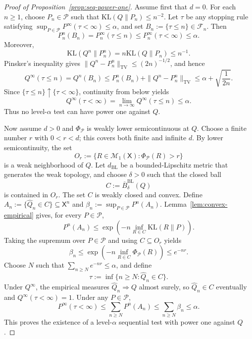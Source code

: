 \documentclass[11pt]{article}
\newcommand{\KL}{\mathrm{KL}}
\newcommand{\Pcal}{\mathcal{P}}
\newcommand{\X}{\mathsf{X}}
\theoremstyle{definition}
\theoremstyle{definition}
\begin{document}
\begin{proof}[Proof of Proposition~\ref{prop:seq-power-one}]
Assume first that $d=0$.  For each $n\ge1$, choose $P_n\in\Pcal$ such that $\KL(Q\|P_n)\le n^{-2}$.  Let $\tau$ be any stopping rule satisfying $\sup_{P\in\Pcal}P^\infty(\tau<\infty)\le\alpha$, and set $B_n:=\{\tau\le n\}\in\mathcal F_n$.  Then
\[
  P_n^n(B_n)=P_n^\infty(\tau\le n)\le P_n^\infty(\tau<\infty)\le\alpha.
\]
Moreover,
\[
  \KL(Q^n\|P_n^n)=n\KL(Q\|P_n)\le n^{-1}.
\]
Pinsker's inequality gives $\|Q^n-P_n^n\|_{\mathrm{TV}}\le (2n)^{-1/2}$, and hence
\[
  Q^\infty(\tau\le n)=Q^n(B_n)
  \le P_n^n(B_n)+\|Q^n-P_n^n\|_{\mathrm{TV}}
  \le \alpha+\sqrt{\frac1{2n}}.
\]
Since $\{\tau\le n\}\uparrow\{\tau<\infty\}$, continuity from below yields
\[
  Q^\infty(\tau<\infty)
  =\lim_{n\to\infty}Q^\infty(\tau\le n)
  \le\alpha.
\]
Thus no level-$\alpha$ test can have power one against $Q$.

Now assume $d>0$ and $\Phi_\Pcal$ is weakly lower semicontinuous at $Q$.  Choose a finite number $r$ with $0<r<d$; this covers both finite and infinite $d$.  By lower semicontinuity, the set
\[
  O_r:=\{R\in\mathcal M_1(\X):\Phi_\Pcal(R)>r\}
\]
is a weak neighborhood of $Q$.  Let $d_{\mathrm{BL}}$ be a bounded-Lipschitz metric that generates the weak topology, and choose $\delta>0$ such that the closed ball
\[
  C:=\overline B^{\mathrm{BL}}_\delta(Q)
\]
is contained in $O_r$.  The set $C$ is weakly closed and convex.  Define $A_n:=\{\widehat Q_n\in C\}\subseteq\X^n$ and $\beta_n:=\sup_{P\in\Pcal}P^n(A_n)$.  Lemma~\ref{lem:convex-empirical} gives, for every $P\in\Pcal$,
\[
  P^n(A_n)
  \le \exp\left(-n\inf_{R\in C}\KL(R\|P)\right).
\]
Taking the supremum over $P\in\Pcal$ and using $C\subseteq O_r$ yields
\[
  \beta_n\le \exp\left(-n\inf_{R\in C}\Phi_\Pcal(R)\right)\le e^{-nr}.
\]
Choose $N$ such that $\sum_{n\ge N}e^{-nr}\le\alpha$, and define
\[
  \tau:=\inf\{n\ge N:\widehat Q_n\in C\}.
\]
Under $Q^\infty$, the empirical measures $\widehat Q_n\Rightarrow Q$ almost surely, so $\widehat Q_n\in C$ eventually and $Q^\infty(\tau<\infty)=1$.  Under any $P\in\Pcal$,
\[
  P^\infty(\tau<\infty)
  \le \sum_{n\ge N}P^n(A_n)
  \le \sum_{n\ge N}\beta_n
  \le\alpha.
\]
This proves the existence of a level-$\alpha$ sequential test with power one against $Q$.
\end{proof}
\end{document}
